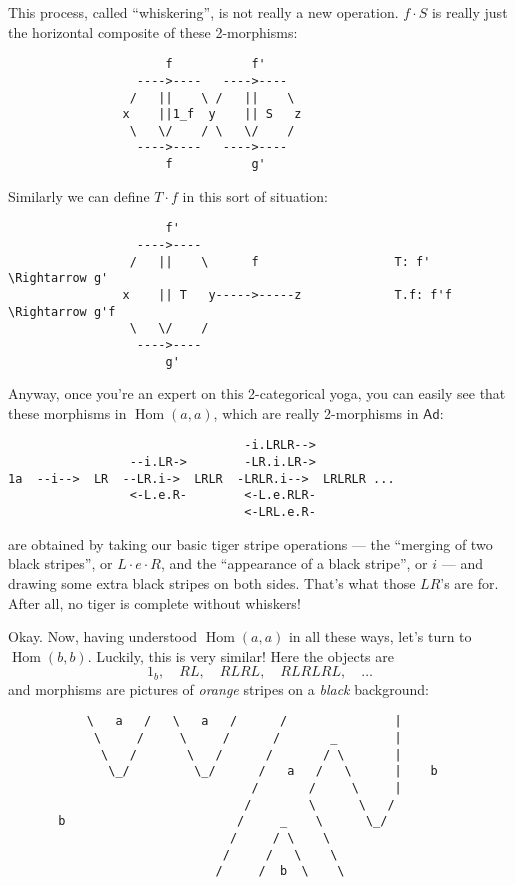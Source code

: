 \documentclass{article}
\begin{document}
This process, called ``whiskering'', is not really a new operation.
\(f\cdot S\) is really just the horizontal composite of these
2-morphisms:

\begin{verbatim}
                      f           f'
                  ---->----   ---->----  
                 /   ||    \ /   ||    \              
                x    ||1_f  y    || S   z             
                 \   \/    / \   \/    /
                  ---->----   ---->----
                      f           g'
\end{verbatim}

Similarly we can define \(T\cdot f\) in this sort of situation:

\begin{verbatim}
                      f'           
                  ---->----   
                 /   ||    \      f                   T: f' \Rightarrow g'
                x    || T   y----->-----z             T.f: f'f \Rightarrow g'f
                 \   \/    /
                  ---->---- 
                      g'     
\end{verbatim}

Anyway, once you're an expert on this 2-categorical yoga, you can easily
see that these morphisms in \(\operatorname{Hom}(a,a)\), which are
really 2-morphisms in \(\mathsf{Ad}\):

\begin{verbatim}
                                 -i.LRLR-->
                 --i.LR->        -LR.i.LR->
1a  --i-->  LR  --LR.i->  LRLR  -LRLR.i-->  LRLRLR ...
                 <-L.e.R-        <-L.e.RLR-
                                 <-LRL.e.R-
\end{verbatim}

are obtained by taking our basic tiger stripe operations --- the
``merging of two black stripes'', or \(L\cdot e\cdot R\), and the
``appearance of a black stripe'', or \(i\) --- and drawing some extra
black stripes on both sides. That's what those \(LR\)'s are for. After
all, no tiger is complete without whiskers!

Okay. Now, having understood \(\operatorname{Hom}(a,a)\) in all these
ways, let's turn to \(\operatorname{Hom}(b,b)\). Luckily, this is very
similar! Here the objects are
\[1_b,\quad RL,\quad RLRL,\quad RLRLRL,\quad \ldots\] and morphisms are
pictures of \emph{orange} stripes on a \emph{black} background:

\begin{verbatim}
           \   a   /   \   a   /      /               |
            \     /     \     /      /       _        |
             \   /       \   /      /       / \       |
              \_/         \_/      /   a   /   \      |    b
                                  /       /     \     |
                                 /        \      \   / 
       b                        /     _    \      \_/ 
                               /     / \    \      
                              /     /   \    \       
                             /     /  b  \    \  
\end{verbatim}
\end{document}
